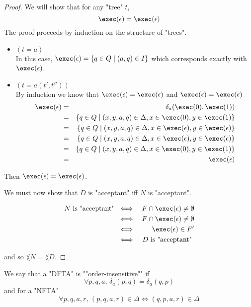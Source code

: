 \documentclass{article}
\begin{document}
\begin{proof}
	We will show that for any "tree" $t$,
	\[ \exec (\epsilon)  = \exec (\epsilon) \]
	The proof proceeds by induction on the structure of "trees".
	\begin{itemize}
		\item $(t = a)$\\
		      In this case, $\exec (\epsilon) = \setdef {q \in Q} {(a,q) \in I}$ which corresponds
		      exactly with $\exec (\epsilon)$.

		\item $(t = a(t',t''))$\\
		      By induction we know that
		      $\exec (\epsilon) = \exec (\epsilon)$
		      and
		      $\exec (\epsilon) =  \exec (\epsilon)$
		      \begin{eqnarray*}
			      \exec (\epsilon) &=& \delta_a(\exec (0), \exec (1)) \\
			      &=& \setdef {q \in  Q} {(x,y,a,q) \in \Delta, x \in \exec (0), y \in \exec (1)}\\
			      &=& \setdef {q \in  Q} {(x,y,a,q) \in \Delta, x \in \exec (\epsilon), y \in \exec (\epsilon)}\\
			      &=& \setdef {q \in  Q} {(x,y,a,q) \in \Delta, x \in \exec (\epsilon), y \in \exec (\epsilon)}\\
			      &=& \setdef {q \in  Q} {(x,y,a,q) \in \Delta, x \in \exec (0), y \in \exec (1)}\\
			      &=& \exec (\epsilon)
		      \end{eqnarray*}
	\end{itemize}
	Then $ \exec (\epsilon) = \exec (\epsilon)$.

	We must now show that $D$ is "acceptant" iff $N$ is "acceptant".

	\begin{eqnarray*}
		N \text{ is "acceptant" } &\iff& F \cap \exec (\epsilon) \neq \emptyset \\
		&\iff& F \cap \exec (\epsilon) \neq \emptyset \\
		&\iff& \exec (\epsilon) \in F' \\
		&\iff& D \text{ is "acceptant" }
	\end{eqnarray*}

	and so $\lang N = \lang D$.

\end{proof}


\begin{definition}
	We say that a "DFTA" is ""order-insensitive"" if
	\[ \forall p,q,a,\, \delta_a (p,q) = \delta_a (q,p) \]
	and for a "NFTA"
	\[ \forall p,q,a,r,\, (p,q,a,r) \in \Delta \iff  (q,p,a,r) \in \Delta \]
\end{definition}
\end{document}
